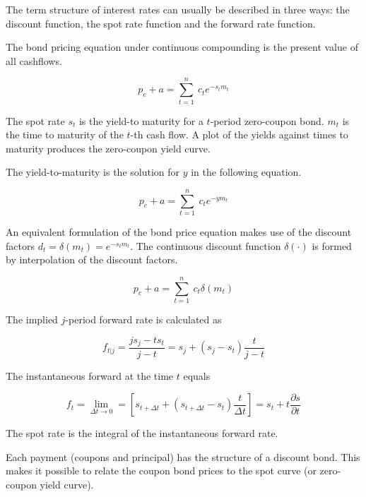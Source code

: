 The term structure of interest rates can usually be described in three ways: the discount function, the
spot rate function and the forward rate function.

The bond pricing equation under continuous compounding is the present value of all cashflows.

\begin{equation}
  \label{bondpriceeq}
  p_c+a = \sum_{t=1}^n \ c_t e^{-s_tm_t}
\end{equation}

The spot rate $s_t$ is the yield-to maturity for a $t$-period zero-coupon bond. $m_t$ is the time to maturity of the $t$-th cash flow. A plot of the yields against times to maturity produces the zero-coupon yield curve.

The yield-to-maturity is the solution for $y$ in the following equation.

\begin{equation}
  \label{yield}
  p_c+a=\sum_{t=1}^n \ c_t e^{-ym_t}
\end{equation}

An equivalent formulation of the bond price equation makes use of the discount factors $d_t=\delta(m_t)=e^{-s_tm_t}$. The continuous discount function $\delta(\cdot)$ is formed by interpolation of the discount factors.

\begin{equation}
  \label{bondprceq2}
  p_c+a=\sum_{t=1}^n \ c_t \delta(m_t) \end{equation}


The implied $j$-period forward rate is calculated as

\begin{equation}
  \label{forwrate}
  f_{t|j}=\frac{js_j-ts_t}{j-t}=s_j+(s_j-s_t)\frac{t}{j-t}
\end{equation}

The instantaneous forward at the time $t$ equals

\begin{equation}
  \label{instfwdrate}
  f_t=\lim_{\Delta t \rightarrow 0}=\left[s_{t+\Delta t}+(s_{t+\Delta t}-s_t)\frac{t}{\Delta t}\right]=s_t+t\frac{\partial s}{\partial t}
\end{equation}

The spot rate is the integral of the instantaneous forward rate.


Each payment (coupons and principal) has the structure of a discount bond. This makes it possible to relate the coupon bond prices to the spot curve (or zero-coupon yield curve).

